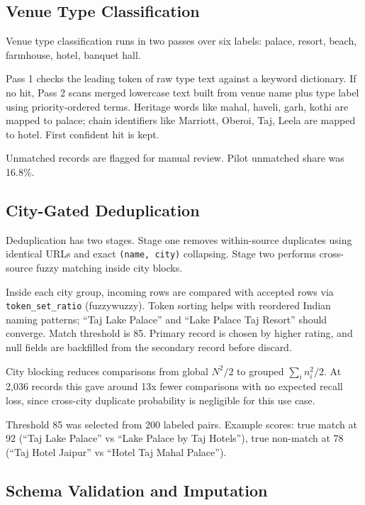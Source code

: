 \documentclass[conference]{IEEEtran}
\begin{document}
\subsection{Venue Type Classification}

Venue type classification runs in two passes over six labels: palace, resort, beach, farmhouse, hotel, banquet hall.

Pass 1 checks the leading token of raw type text against a keyword dictionary. If no hit, Pass 2 scans merged lowercase text built from venue name plus type label using priority-ordered terms. Heritage words like mahal, haveli, garh, kothi are mapped to palace; chain identifiers like Marriott, Oberoi, Taj, Leela are mapped to hotel. First confident hit is kept.

Unmatched records are flagged for manual review. Pilot unmatched share was 16.8\%.

\subsection{City-Gated Deduplication}

Deduplication has two stages. Stage one removes within-source duplicates using identical URLs and exact \texttt{(name, city)} collapsing. Stage two performs cross-source fuzzy matching inside city blocks.

Inside each city group, incoming rows are compared with accepted rows via \texttt{token\_set\_ratio} (fuzzywuzzy). Token sorting helps with reordered Indian naming patterns; ``Taj Lake Palace'' and ``Lake Palace Taj Resort'' should converge. Match threshold is 85. Primary record is chosen by higher rating, and null fields are backfilled from the secondary record before discard.

City blocking reduces comparisons from global $N^2 / 2$ to grouped $\sum_i n_i^2 / 2$. At 2,036 records this gave around 13x fewer comparisons with no expected recall loss, since cross-city duplicate probability is negligible for this use case.

Threshold 85 was selected from 200 labeled pairs. Example scores: true match at 92 (``Taj Lake Palace'' vs ``Lake Palace by Taj Hotels''), true non-match at 78 (``Taj Hotel Jaipur'' vs ``Hotel Taj Mahal Palace'').

\subsection{Schema Validation and Imputation}
\end{document}
